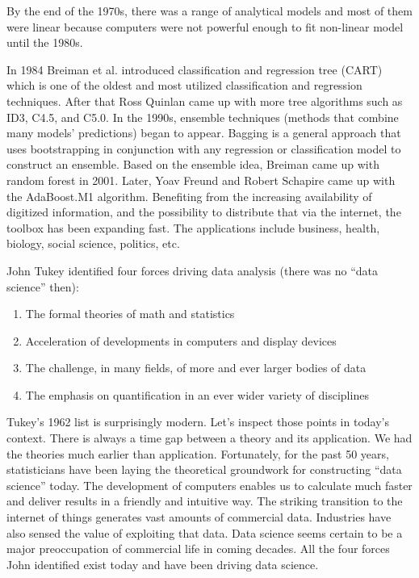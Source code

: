 \documentclass[12pt,]{krantz}
\providecommand{\tightlist}{%
  \setlength{\itemsep}{0pt}\setlength{\parskip}{0pt}}
\theoremstyle{definition}
\theoremstyle{definition}
\theoremstyle{definition}
\theoremstyle{remark}
\begin{document}
By the end of the 1970s, there was a range of analytical models and most
of them were linear because computers were not powerful enough to fit
non-linear model until the 1980s.

In 1984 Breiman et al. introduced classification and regression tree
(CART) which is one of the oldest and most utilized classification and
regression techniques. After that Ross Quinlan came up with more tree
algorithms such as ID3, C4.5, and C5.0. In the 1990s, ensemble
techniques (methods that combine many models' predictions) began to
appear. Bagging is a general approach that uses bootstrapping in
conjunction with any regression or classification model to construct an
ensemble. Based on the ensemble idea, Breiman came up with random forest
in 2001. Later, Yoav Freund and Robert Schapire came up with the
AdaBoost.M1 algorithm. Benefiting from the increasing availability of
digitized information, and the possibility to distribute that via the
internet, the toolbox has been expanding fast. The applications include
business, health, biology, social science, politics, etc.

John Tukey identified four forces driving data analysis (there was no
``data science'' then):

\begin{enumerate}
\def\labelenumi{\arabic{enumi}.}
\tightlist
\item
  The formal theories of math and statistics
\item
  Acceleration of developments in computers and display devices
\item
  The challenge, in many fields, of more and ever larger bodies of data
\item
  The emphasis on quantification in an ever wider variety of disciplines
\end{enumerate}

Tukey's 1962 list is surprisingly modern. Let's inspect those points in
today's context. There is always a time gap between a theory and its
application. We had the theories much earlier than application.
Fortunately, for the past 50 years, statisticians have been laying the
theoretical groundwork for constructing ``data science'' today. The
development of computers enables us to calculate much faster and deliver
results in a friendly and intuitive way. The striking transition to the
internet of things generates vast amounts of commercial data. Industries
have also sensed the value of exploiting that data. Data science seems
certain to be a major preoccupation of commercial life in coming
decades. All the four forces John identified exist today and have been
driving data science.
\end{document}

